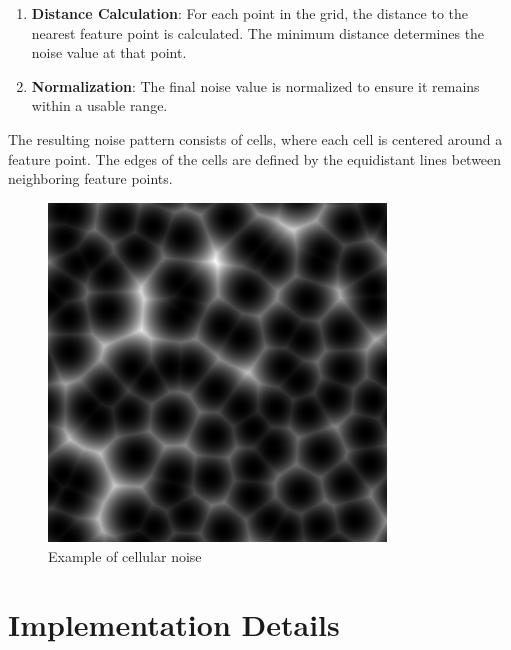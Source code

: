 \documentclass[12pt]{article}
\begin{document}
\begin{itemize}
\begin{enumerate}
        \item \textbf{Distance Calculation}:
        \newline
        For each point in the grid, the distance to the nearest feature point is calculated. The minimum distance determines the noise value at that point.   

        \item \textbf{Normalization}:
        \newline
        The final noise value is normalized to ensure it remains within a usable range.
    \end{enumerate}
    
    The resulting noise pattern consists of cells, where each cell is centered around a feature point. The edges of the cells are defined by the equidistant lines between neighboring feature points.

    \begin{figure}[H]
        \centering
        \includegraphics[width=0.8\textwidth]{Images/cellular.png}
        \caption{Example of cellular noise}
    \end{figure} 
    
\end{itemize}

\newpage

\section{Implementation Details}
\label{sec:implementation}

\newpage
\end{document}
